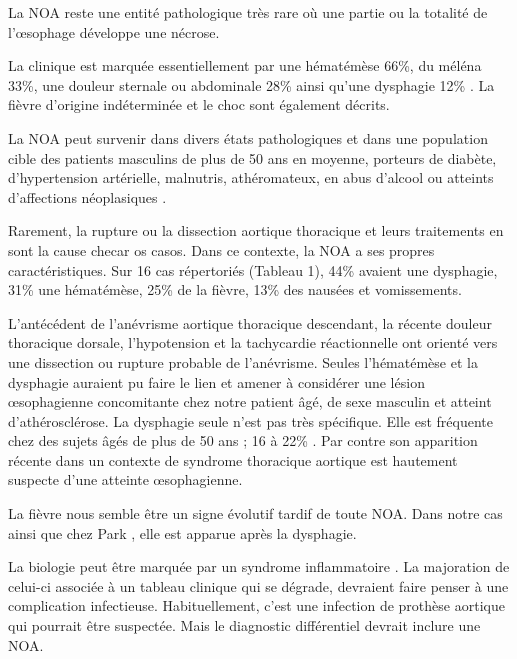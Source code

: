 \documentclass[./tfe.tex]{subfiles}
\begin{document}
La NOA reste une entité pathologique très rare où une partie ou la totalité de l’œsophage développe une nécrose\cite{gurvits_acute_2007, abdullah_clinical_2019}.

La clinique est marquée essentiellement par une hématémèse 66\%, du méléna 33\%, une douleur sternale ou abdominale 28\% ainsi qu’une dysphagie 12\% \cite{abdullah_clinical_2019}. La fièvre d'origine indéterminée et le choc sont également décrits.

La NOA peut survenir dans divers états pathologiques et dans une population cible des patients masculins de plus de 50 ans en moyenne, porteurs de diabète, d’hypertension artérielle, malnutris, athéromateux, en abus d’alcool ou atteints d’affections néoplasiques \cite{gurvits_acute_2007, abdullah_clinical_2019}.

Rarement, la rupture ou la dissection aortique thoracique et leurs traitements en sont la cause \cite{gurvits_acute_2007, iuamoto_necrose_2015, lacombe_acute_1971}  checar os casos.
Dans ce contexte, la NOA a ses propres caractéristiques. Sur 16 cas répertoriés (Tableau 1), 44\% avaient une dysphagie, 31\% une hématémèse, 25\% de la fièvre, 13\% des nausées et vomissements.

L’antécédent de l’anévrisme aortique thoracique descendant, la récente douleur thoracique dorsale, l’hypotension et la tachycardie réactionnelle ont orienté vers une dissection ou rupture probable de l’anévrisme. Seules l’hématémèse et la dysphagie auraient pu faire le lien et amener à considérer une lésion œsophagienne concomitante chez notre patient âgé, de sexe masculin et atteint d’athérosclérose. La dysphagie seule n’est pas très spécifique. Elle est fréquente chez des sujets âgés de plus de 50 ans ; 16 à 22\% \cite{patel_hard_2020}. Par contre son apparition récente dans un contexte de syndrome thoracique aortique est hautement suspecte d’une atteinte œsophagienne.

La fièvre nous semble être un signe évolutif tardif de toute NOA. Dans notre cas ainsi que chez Park \cite{park_ischemic_2004}, elle est apparue après la dysphagie.



La biologie peut être marquée par un syndrome inflammatoire \cite{gurvits_acute_2007, chiesa_aorto-oesophageal_2010, czerny_new_2014}. La majoration de celui-ci associée à un tableau clinique qui se dégrade, devraient faire penser à une complication infectieuse. Habituellement, c’est une infection de prothèse aortique qui pourrait être suspectée. Mais le diagnostic différentiel devrait inclure une NOA.
\end{document}

